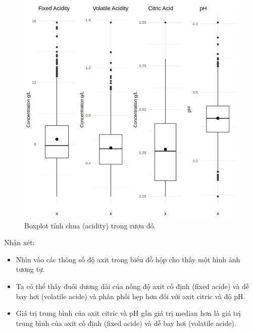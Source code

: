 \begin{figure}[H]
    \centering
    \includegraphics[width=0.75\columnwidth]{wine_figures/red_acidity_boxplot.png}
    \caption{Boxplot tính chua (acidity) trong rượu đỏ.}
    \label{fig:red_acidity_boxplot}
\end{figure}
Nhận xét:
\begin{itemize}
    \item Nhìn vào các thông số độ axit trong biểu đồ hộp cho thấy một hình ảnh tương tự. 
    \item Ta có thể thấy đuôi dương dài của nồng độ axit cố định (fixed acide) và dễ bay hơi (volatile acide) và phân phối hẹp hơn đối với axit citric và độ pH. 
    \item Giá trị trung bình của axit citric và pH gần giá trị median hơn là giá trị trung bình của axit cố định (fixed acide) và dễ bay hơi (volatile acide).
\end{itemize}

